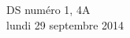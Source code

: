 \documentclass[a4paper,10pt]{article}
\begin{document}

\begin{feuilleDS}{DS numéro 1, 4A\\ \small lundi 29 septembre 2014}



\end{feuilleDS}
\end{document}
